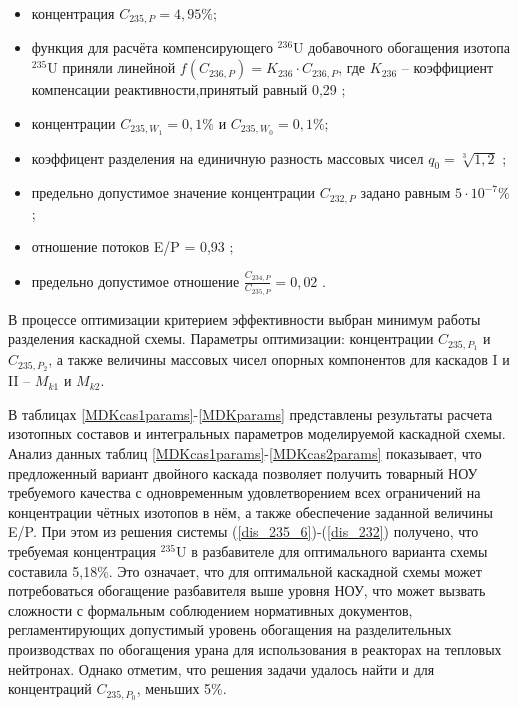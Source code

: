 \begin{itemize}
    \item концентрация $C_{235,{P}} = {4,95\%}$; 
    \item функция для расчёта компенсирующего $^{236}$U добавочного обогащения изотопа $^{235}$U приняли линейной $f(C_{236,P}) = {K_{236}\cdot{C_{236,{P}}}}$, где $K_{236}$ -- коэффициент компенсации реактивности,принятый равный 0,29 \cite{smirnovEvolutionIsotopicComposition2012};
    \item концентрации $C_{235,{W_1}} = 0,1\%$ и $C_{235,{W_0}} = 0,1\%$;
    \item коэффицент разделения на единичную разность массовых чисел $q_{0} = \sqrt[3]{1,2}$ \cite{smirnovEvolutionIsotopicComposition2012};
    \item предельно допустимое значение концентрации $C_{232,{P}}$ задано равным $5\cdot10^{-7} \%$;
    \item отношение потоков E/P = 0,93 \cite{smirnovObogashchenieRegenerirovannogoUrana2018};
    \item предельно допустимое отношение $\frac{C_{234,{P}}}{C_{235,{P}}} = 0,02$ \cite{smirnovObogashchenieRegenerirovannogoUrana2018}. 
\end{itemize}

В процессе оптимизации критерием эффективности выбран минимум работы разделения каскадной схемы. Параметры оптимизации: концентрации $C_{235,{P_1}}$ и $C_{235,{P_2}}$, а также величины массовых чисел опорных компонентов для каскадов I и II -- $M_{k1}$ и $M_{k2}$. 

В таблицах \ref{MDKcas1params}-\ref{MDKparams} представлены результаты расчета изотопных составов и интегральных параметров моделируемой каскадной схемы. Анализ данных таблиц \ref{MDKcas1params}-\ref{MDKcas2params} показывает, что предложенный вариант двойного каскада позволяет получить товарный НОУ требуемого качества с одновременным удовлетворением всех ограничений на концентрации чётных изотопов в нём, а также обеспечение заданной величины E/P. При этом из решения системы (\ref{dis_235_6})-(\ref{dis_232}) получено, что требуемая концентрация $^{235}$U в разбавителе для оптимального варианта схемы составила 5,18\%. Это означает, что для оптимальной каскадной схемы может потребоваться обогащение разбавителя выше уровня НОУ, что может вызвать сложности с формальным соблюдением нормативных документов, регламентирующих допустимый уровень обогащения на разделительных производствах по обогащения урана для использования в реакторах на тепловых нейтронах. Однако отметим, что решения задачи удалось найти и для концентраций $C_{235,{P_0}}$, меньших 5\%.

